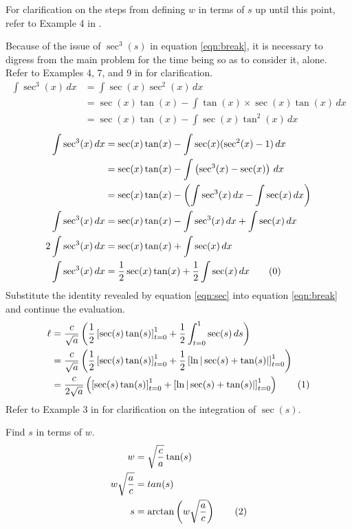 \documentclass{article}
\begin{document}
For clarification on the steps from defining $w$ in terms of $s$ up until this point, refer to Example 4 in \cite{Bib:Class1Var}.\par
Because of the issue of $\sec^3(s)$ in equation \ref{eqn:break}, it is necessary to digress from the main problem for the time being so as to consider it, alone. Refer to Examples 4, 7, and 9 in \cite{Bib:Class1Var} for clarification.
\begin{align*}
    \int \sec^3(x)\, dx &= \int \sec(x)\sec^2(x)\, dx\\
    &= \sec(x)\tan(x)-\int \tan(x)\times\sec(x)\tan(x)\, dx\\
    &= \sec(x)\tan(x)-\int \sec(x)\tan^2(x)\, dx
\end{align*}
\begin{align*}
    \int \sec^3(x)\, dx &= \sec(x)\tan(x)-\int \sec(x)(\sec^2(x)-1)\, dx\\
    &= \sec(x)\tan(x)-\int \left(\sec^3(x)-\sec(x)\right)\, dx\\
    &= \sec(x)\tan(x)-\left(\int \sec^3(x)\, dx-\int \sec(x)\, dx\right)\\
    \int \sec^3(x)\, dx &= \sec(x)\tan(x)-\int \sec^3(x)\, dx+\int \sec(x)\, dx\\
    2\int \sec^3(x)\, dx &= \sec(x)\tan(x)+\int \sec(x)\, dx\\
    \int \sec^3(x)\, dx &= \frac{1}{2}\sec(x)\tan(x)+\frac{1}{2}\int \sec(x)\, dx\tag{\theequation}\label{eqn:sec}
    \stepcounter{equation}
\end{align*}
Substitute the identity revealed by equation \ref{eqn:sec} into equation \ref{eqn:break} and continue the evaluation.
\begin{align*}
    \ell &= \frac{c}{\sqrt{a}}\left(\frac{1}{2}\left[\sec(s)\tan(s)\right]_{t=0}^1+\frac{1}{2}\int_{t=0}^1 \sec(s)\, ds\right)\\
    &= \frac{c}{\sqrt{a}}\left(\frac{1}{2}\left[\sec(s)\tan(s)\right]_{t=0}^1+\frac{1}{2}\left[\ln|\sec(s)+\tan(s)|\right]_{t=0}^1\right)\\
    &= \frac{c}{2\sqrt{a}}\left(\left[\sec(s)\tan(s)\right]_{t=0}^1+\left[\ln|\sec(s)+\tan(s)|\right]_{t=0}^1\right)\tag{\theequation}\label{eqn:integrated}
    \stepcounter{equation}
\end{align*}
Refer to Example 3 in \cite{Bib:Class1Var} for clarification on the integration of $\sec(s)$.\par
Find $s$ in terms of $w$.
\begin{align*}
    w &= \sqrt{\frac{c}{a}}\tan(s)\\
    w\sqrt{\frac{a}{c}} &= tan(s)\\
    s &= \arctan\left(w\sqrt{\frac{a}{c}}\right)\tag{\theequation}\label{eqn:SinW}
    \stepcounter{equation}
\end{align*}
\end{document}
